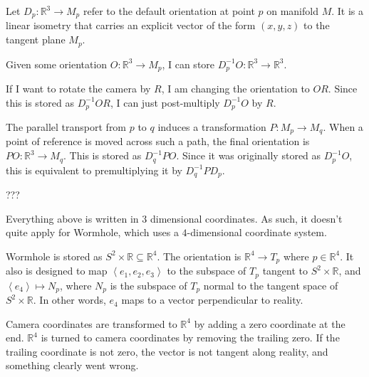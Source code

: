 Let $D_p:\mathbb{R}^3 \to M_p$ refer to the default orientation at point $p$ on manifold $M$. It is a linear isometry that carries an explicit vector of the form $(x,y,z)$ to the tangent plane $M_p$.

Given some orientation $O:\mathbb{R}^3 \to M_p$, I can store $D_p^{-1}O:\mathbb{R}^3 \to \mathbb{R}^3$.

If I want to rotate the camera by $R$, I am changing the orientation to $OR$. Since this is stored as $D_p^{-1}OR$, I can just post-multiply $D_p^{-1}O$ by $R$.


The parallel transport from $p$ to $q$ induces a transformation $P:M_p \to M_q$. When a point of reference is moved across such a path, the final orientation is $PO: \mathbb{R}^3 \to M_q$. This is stored as $D_q^{-1}PO$. Since it was originally stored as $D_p^{-1}O$, this is equivalent to premultiplying it by $D_q^{-1}PD_p$.


???

Everything above is written in $3$ dimensional coordinates. As such, it doesn't quite apply for Wormhole, which uses a $4$-dimensional coordinate system.

Wormhole is stored as $S^2 \times \mathbb{R} \subseteq \mathbb{R}^4$. The orientation is $\mathbb{R}^4 \to T_p$ where $p \in \mathbb{R}^4$. It also is designed to map $\left<e_1,e_2,e_3\right>$ to the subspace of $T_p$ tangent to $S^2 \times \mathbb{R}$, and $\left<e_4\right> \mapsto N_p$, where $N_p$ is the subspace of $T_p$ normal to the tangent space of $S^2 \times \mathbb{R}$. In other words, $e_4$ maps to a vector perpendicular to reality.

Camera coordinates are transformed to $\mathbb{R}^4$ by adding a zero coordinate at the end. $\mathbb{R}^4$ is turned to camera coordinates by removing the trailing zero. If the trailing coordinate is not zero, the vector is not tangent along reality, and something clearly went wrong.

